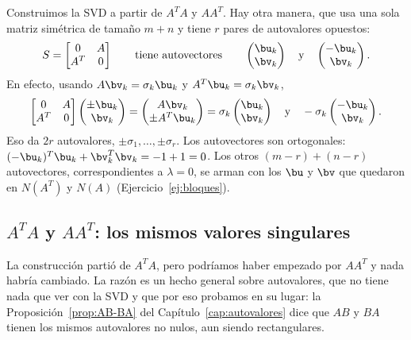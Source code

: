 Construimos la SVD a partir de $A^TA$ y $AA^T$. Hay otra manera, que usa una
sola matriz simétrica de tamaño $m+n$ y tiene $r$ pares de autovalores
opuestos:
\[
S=\begin{bmatrix}0&A\\ A^T&0\end{bmatrix}
\qquad\text{tiene autovectores}\qquad
\begin{pmatrix}\bu_k\\ \bv_k\end{pmatrix}
\quad\text{y}\quad
\begin{pmatrix}-\bu_k\\ \bv_k\end{pmatrix} .
\]
En efecto, usando $A\bv_k=\sigma_k\bu_k$ y $A^T\bu_k=\sigma_k\bv_k$,
\begin{equation}\label{eq:bloques-SVD}
\begin{bmatrix}0&A\\ A^T&0\end{bmatrix}
\begin{pmatrix}\pm\bu_k\\ \bv_k\end{pmatrix}
=\begin{pmatrix}A\bv_k\\ \pm A^T\bu_k\end{pmatrix}
=\sigma_k\begin{pmatrix}\bu_k\\ \bv_k\end{pmatrix}
\quad\text{y}\quad
-\sigma_k\begin{pmatrix}-\bu_k\\ \bv_k\end{pmatrix} .
\end{equation}
Eso da $2r$ autovalores, $\pm\sigma_1,\dots,\pm\sigma_r$. Los autovectores son
ortogonales: $(-\bu_k)^T\bu_k+\bv_k^T\bv_k=-1+1=0$. Los otros
$(m-r)+(n-r)$ autovectores, correspondientes a $\lambda=0$, se arman con los
$\bu$ y $\bv$ que quedaron en $N(A^T)$ y $N(A)$
(Ejercicio~\ref{ej:bloques}).

\subsection{$A^TA$ y $AA^T$: los mismos valores singulares}

La construcción partió de $A^TA$, pero podríamos haber empezado por $AA^T$ y
nada habría cambiado. La razón es un hecho general sobre autovalores, que no
tiene nada que ver con la SVD y que por eso probamos en su lugar: la
Proposición~\ref{prop:AB-BA} del Capítulo~\ref{cap:autovalores} dice que $AB$
y $BA$ tienen los mismos autovalores no nulos, aun siendo rectangulares.

